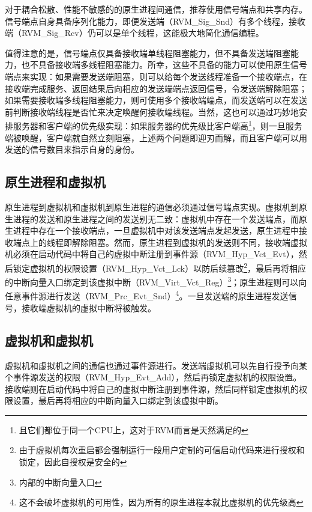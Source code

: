 对于耦合松散、性能不敏感的的原生进程间通信，推荐使用信号端点和共享内存。信号端点自身具备序列化能力，即便发送端（RVM\_Sig\_Snd）有多个线程，接收端（RVM\_Sig\_Rcv）仍可以是单个线程，这能极大地简化通信编程。

值得注意的是，信号端点仅具备接收端单线程阻塞能力，但不具备发送端阻塞能力，也不具备接收端多线程阻塞能力。所幸，这些不具备的能力可以使用原生信号端点来实现：如果需要发送端阻塞，则可以给每个发送线程准备一个接收端点，在接收端完成服务、返回结果后向相应的发送端端点返回信号，令发送端解除阻塞；如果需要接收端多线程阻塞能力，则可使用多个接收端端点，而发送端可以在发送前判断接收端线程是否忙来决定唤醒何接收端线程。当然，这也可以通过巧妙地安排服务器和客户端的优先级实现：如果服务器的优先级比客户端高\footnote{且它们都位于同一个CPU上，这对于RVM而言是天然满足的}，则一旦服务端被唤醒，客户端就自然立刻阻塞，上述两个问题即迎刃而解，而且客户端可以用发送的信号数目来指示自身的身份。

\subsection{原生进程和虚拟机}\label{subsec:6-4-3}

原生进程到虚拟机和虚拟机到原生进程的通信必须通过信号端点实现。虚拟机到原生进程的发送和原生进程之间的发送别无二致：虚拟机中存在一个发送端点，而原生进程中存在一个接收端点，一旦虚拟机中对该发送端点发起发送，原生进程中接收端点上的线程即解除阻塞。然而，原生进程到虚拟机的发送则不同，接收端虚拟机必须在启动代码中将自己的虚拟中断注册到事件源（RVM\_Hyp\_Vct\_Evt），然后锁定虚拟机的权限设置（RVM\_Hyp\_Vct\_Lck）以防后续篡改\footnote{由于虚拟机每次重启都会强制运行一段用户定制的可信启动代码来进行授权和锁定，因此自授权是安全的}，最后再将相应的中断向量入口绑定到该虚拟中断（RVM\_Virt\_Vct\_Reg）\footnote{内部的中断向量入口}；原生进程则可以向任意事件源进行发送（RVM\_Prc\_Evt\_Snd）\footnote{这不会破坏虚拟机的可用性，因为所有的原生进程本就比虚拟机的优先级高}。一旦发送端的原生进程发送信号，接收端虚拟机的虚拟中断将被触发。

\subsection{虚拟机和虚拟机}\label{subsec:6-4-4}

虚拟机和虚拟机之间的通信也通过事件源进行。发送端虚拟机可以先自行授予向某个事件源发送的权限（RVM\_Hyp\_Evt\_Add），然后再锁定虚拟机的权限设置。接收端则在启动代码中将自己的虚拟中断注册到事件源，然后同样锁定虚拟机的权限设置，最后再将相应的中断向量入口绑定到该虚拟中断。

